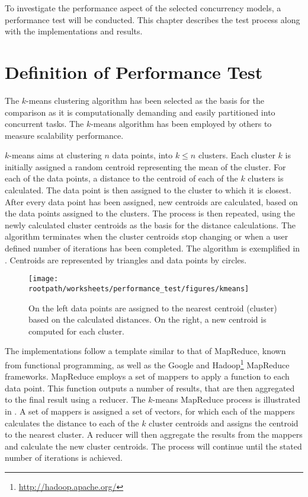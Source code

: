 \makeatletter {}\makeatother
{}
%
To investigate the performance aspect of the selected concurrency models, a performance test will be conducted.  This chapter describes the test process along with the implementations and results. 
\label{chap:performance}
\section{Definition of Performance Test}
\label{sec:test_approach}
The $k$-means clustering algorithm has been selected as the basis for the comparison as it is computationally demanding and easily partitioned into concurrent tasks\cite[p. 128]{epstein2011towards}. The $k$-means algorithm has been employed by others to measure scalability performance\cite{epstein2011towards}\cite{tardieu2014x10}.

$k$-means aims at clustering $n$ data points, into $k \leq n$ clusters\cite[p. 451]{dataminingconceptsandtechniques}\cite[p. 128]{epstein2011towards}. Each cluster $k$ is initially assigned a random centroid representing the mean of the cluster. For each of the data points, a distance to the centroid of each of the $k$ clusters is calculated. The data point is then assigned to the cluster to which it is closest. After every data point has been assigned, new centroids are calculated, based on the data points assigned to the clusters. The process is then repeated, using the newly calculated cluster centroids as the basis for the distance calculations. The algorithm terminates when the cluster centroids stop changing or when a user defined number of iterations has been completed\cite[p. 128]{epstein2011towards}. The algorithm is exemplified in . Centroids are represented by triangles and data points by circles.

\begin{figure}[ht!]
\centering
\texttt{[image: \\rootpath/worksheets/performance\_test/figures/kmeans]}
\caption{On the left data points are assigned to the nearest centroid (cluster) based on the calculated distances. On the right, a new centroid is computed for each cluster.}\label{fig:kmeans}
\end{figure}

The implementations follow a template similar to that of MapReduce\cite{dean2008mapreduce}, known from functional programming, as well as the Google\cite{dean2008mapreduce} and Hadoop\footnote{\url{http://hadoop.apache.org/}} MapReduce frameworks. MapReduce employs a set of mappers to apply a function to each data point. This function outputs a number of results, that are then aggregated to the final result using a reducer. The $k$-means MapReduce process is illustrated in . A set of mappers is assigned a set of vectors, for which each of the mappers calculates the distance to each of the $k$ cluster centroids and assigns the centroid to the nearest cluster. A reducer will then aggregate the results from the mappers and calculate the new cluster centroids. The process will continue until the stated number of iterations is achieved.

